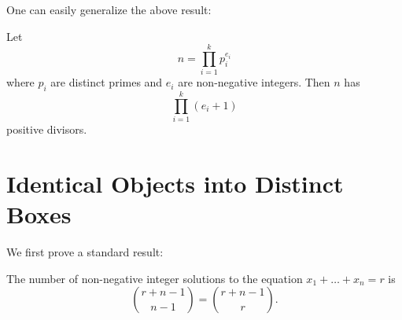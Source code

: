 One can easily generalize the above result:

\begin{proposition}
    Let \[n = \prod_{i = 1}^k p_i^{e_i}\] where $p_i$ are distinct primes and $e_i$ are non-negative integers. Then $n$ has \[\prod_{i = 1}^k (e_i + 1)\] positive divisors.
\end{proposition}

\section{Identical Objects into Distinct Boxes}

We first prove a standard result:

\begin{proposition}
    The number of non-negative integer solutions to the equation $x_1 + \dots + x_n = r$ is \[\binom{r + n - 1}{n - 1} = \binom{r + n - 1}{r}.\]
\end{proposition}
